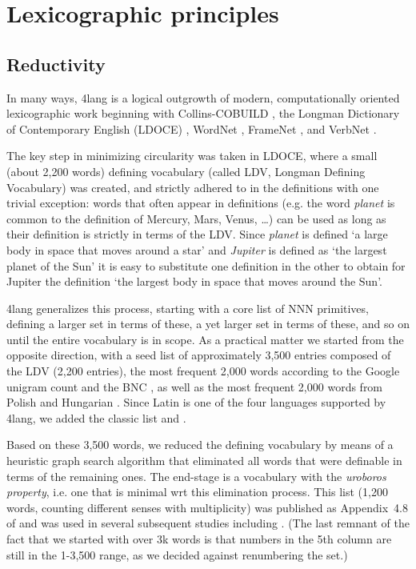 \documentclass[11pt,bookmarks,bookmarksnumbered,naturalnames,plainpages=false,pdftex,colorlinks=true,urlcolor=blue,bookmarksdepth=subsection,plainpages=false]{paper}
\begin{document}
\section{Lexicographic principles}

\subsection{Reductivity}

In many ways, 4lang is a logical outgrowth of modern, computationally oriented
lexicographic work beginning with Collins-COBUILD \citep{Sinclair:1987}, the
Longman Dictionary of Contemporary English (LDOCE) \citep{Boguraev:1989},
WordNet \citep{Miller:1995}, FrameNet \citep{Fillmore:1998}, and VerbNet
\citep{Kipper:2000}. 

The key step in minimizing circularity was taken in LDOCE, where a small
(about 2,200 words) defining vocabulary (called LDV, Longman Defining
Vocabulary) was created, and strictly adhered to in the definitions with one
trivial exception: words that often appear in definitions (e.g. the word {\it
  planet} is common to the definition of Mercury, Mars, Venus, \ldots) can be
used as long as their definition is strictly in terms of the LDV.  Since {\it
  planet} is defined `a large body in space that moves around a star' and
{\it Jupiter} is defined as `the largest planet of the Sun' it is easy to
substitute one definition in the other to obtain for Jupiter the definition
`the largest body in space that moves around the Sun'. 

4lang generalizes this process, starting with a core list of NNN primitives,
defining a larger set in terms of these, a yet larger set in terms of these,
and so on until the entire vocabulary is in scope. As a practical matter we
started from the opposite direction, with a seed list of approximately 3,500
entries composed of the LDV (2,200 entries), the most frequent 2,000 words
according to the Google unigram count \citep{Brants:2006} and the BNC
\citep{Burnard:1998}, as well as the most frequent 2,000 words from Polish
\citep{Halacsy:2008} and Hungarian \citep{Kornai:2006}.  Since Latin is one of
the four languages supported by 4lang, we added the classic
\cite{Diederich:1939} list and \cite{Whitney:1885}.

Based on these 3,500 words, we reduced the defining vocabulary by means of a
heuristic graph search algorithm \citep{Acs:2013} that eliminated all words
that were definable in terms of the remaining ones. The end-stage is a
vocabulary with the {\it uroboros property}, i.e. one that is minimal wrt this
elimination process. This list (1,200 words, counting different senses with
multiplicity) was published as Appendix~4.8 of \cite{Kornai:2019} and was used
in several subsequent studies including \citep{Nemeskey:2018}. (The last
remnant of the fact that we started with over 3k words is that numbers in the
5th column are still in the 1-3,500 range, as we decided against renumbering
the set.)
\end{document}
